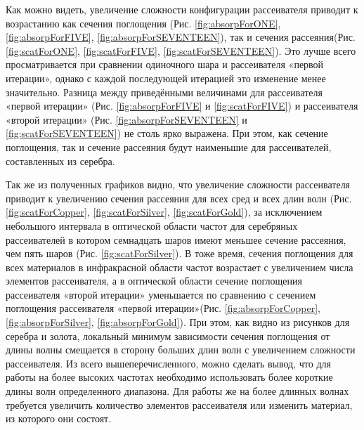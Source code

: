 Как можно видеть, увеличение сложности конфигурации рассеивателя приводит к возрастанию как сечения поглощения (Рис. \ref{fig:absorpForONE}, \ref{fig:absorpForFIVE}, \ref{fig:absorpForSEVENTEEN}), так и сечения рассеяния(Рис. \ref{fig:scatForONE}, \ref{fig:scatForFIVE}, \ref{fig:scatForSEVENTEEN}). Это лучше всего
просматривается при сравнении одиночного шара и рассеивателя «первой итерации», однако с каждой последующей итерацией это изменение менее значительно. Разница между приведёнными величинами для рассеивателя «первой итерации» (Рис. \ref{fig:absorpForFIVE} и \ref{fig:scatForFIVE}) и рассеивателя «второй итерации» (Рис. \ref{fig:absorpForSEVENTEEN} и \ref{fig:scatForSEVENTEEN}) не столь ярко выражена. При этом, как сечение поглощения, так и сечение рассеяния будут наименьшие для рассеивателей, составленных из серебра.
 
Так же из полученных графиков видно, что увеличение сложности рассеивателя приводит к увеличению сечения рассеяния для всех сред и всех длин волн (Рис. \ref{fig:scatForCopper}, \ref{fig:scatForSilver}, \ref{fig:scatForGold}), за исключением небольшого интервала в оптической области частот для серебряных рассеивателей в котором семнадцать шаров имеют меньшее сечение рассеяния, чем пять шаров (Рис. \ref{fig:scatForSilver}). В тоже время, сечения поглощения для всех материалов в инфракрасной области частот возрастает с увеличением числа элементов рассеивателя, а в оптической области сечение поглощения рассеивателя «второй итерации» уменьшается по сравнению с сечением поглощения рассеивателя «первой итерации»(Рис. \ref{fig:absorpForCopper}, \ref{fig:absorpForSilver}, \ref{fig:absorpForGold}).
При этом, как видно из рисунков для серебра и золота, локальный минимум зависимости сечения поглощения от длины волны смещается в сторону больших длин волн с увеличением сложности рассеивателя.
Из всего вышеперечисленного, можно сделать вывод, что для работы на более высоких частотах необходимо использовать более короткие длины волн определенного диапазона. Для работы же на более длинных волнах требуется увеличить количество элементов рассеивателя или изменить материал, из которого они состоят.\\

